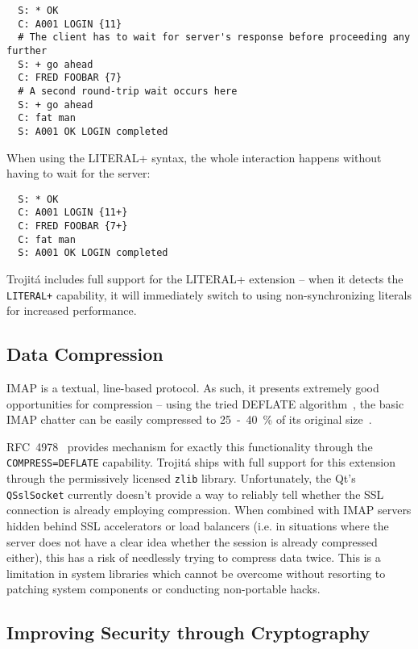 \documentclass[trojita]{subfiles}
\begin{document}
\begin{verbatim}
  S: * OK
  C: A001 LOGIN {11}
  # The client has to wait for server's response before proceeding any further
  S: + go ahead
  C: FRED FOOBAR {7}
  # A second round-trip wait occurs here
  S: + go ahead
  C: fat man
  S: A001 OK LOGIN completed
\end{verbatim}

When using the LITERAL+ syntax, the whole interaction happens without having to wait for the server:

\begin{verbatim}
  S: * OK
  C: A001 LOGIN {11+}
  C: FRED FOOBAR {7+}
  C: fat man
  S: A001 OK LOGIN completed
\end{verbatim}

Trojitá includes full support for the LITERAL+ extension -- when it detects the {\tt LITERAL+} capability, it will
immediately switch to using non-synchronizing literals for increased performance.

\subsection{Data Compression}

IMAP is a textual, line-based protocol.  As such, it presents extremely good opportunities for compression -- using the
tried DEFLATE algorithm~\cite{rfc1951}, the basic IMAP chatter can be easily compressed to 25~-~40~\% of its original
size~\cite[p. 4]{rfc4978}.

RFC~4978~\cite{rfc4978} provides mechanism for exactly this functionality through the {\tt COMPRESS=DEFLATE} capability.
Trojitá ships with full support for this extension through the permissively licensed {\tt zlib} library.  Unfortunately,
the Qt's {\tt QSslSocket} currently doesn't provide a way to reliably tell whether the SSL connection is already
employing compression.  When combined with IMAP servers hidden behind SSL accelerators or load balancers (i.e. in
situations where the server does not have a clear idea whether the session is already compressed either), this has a
risk of needlessly trying to compress data twice.  This is a limitation in system libraries which cannot be overcome
without resorting to patching system components or conducting non-portable hacks.

\subsection{Improving Security through Cryptography}
\end{document}
